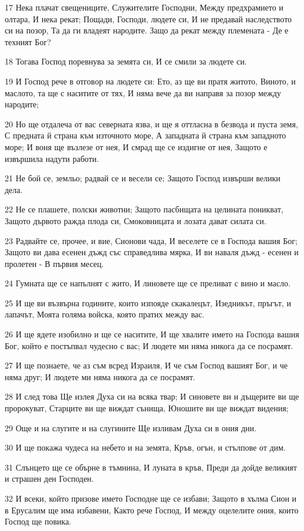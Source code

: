 \par 17 Нека плачат свещениците, Служителите Господни, Между предхрамието и олтара, И нека рекат; Пощади, Господи, людете си, И не предавай наследството си на позор, Та да ги владеят народите. Защо да рекат между племената - Де е техният Бог?
\par 18 Тогава Господ поревнува за земята си, И се смили за людете си.
\par 19 И Господ рече в отговор на людете си: Ето, аз ще ви пратя житото, Виното, и маслото, та ще с наситите от тях, И няма вече да ви направя за позор между народите;
\par 20 Но ще отдалеча от вас северната язва, и ще я оттласна в безвода  и пуста земя, С предната й страна към източното море, А западната й страна към западното море; И воня ще възлезе от нея, И смрад ще се издигне от нея, Защото е извършила надути работи.
\par 21 Не бой се, земльо; радвай се и весели се; Защото Господ извърши велики дела.
\par 22 Не се плашете, полски животни; Защото пасбищата на целината поникват, Защото дървото ражда плода си, Смоковницата и лозата дават силата си.
\par 23 Радвайте се, прочее, и вие, Сионови чада, И веселете се в Господа вашия Бог; Защото ви дава есенен дъжд със справедлива мярка, И ви наваля дъжд - есенен и пролетен -  В първия месец.
\par 24 Гумната ще се напълнят с жито, И линовете ще се преливат с вино и масло.
\par 25 И ще ви възвърна годините, които изпояде скакалецът, Изедникът, пръгът, и лапачът, Моята голяма войска, която пратих между вас.
\par 26 И ще ядете изобилно и ще се наситите, И ще хвалите името на Господа вашия Бог, който е постъпвал чудесно с вас; И людете ми няма никога да се посрамят.
\par 27 И ще познаете, че аз съм всред Израиля, И че съм Господ вашият Бог, и че няма друг; И людете ми няма никога да се посрамят.
\par 28 И след това Ще излея Духа си на всяка твар; И синовете ви и дъщерите ви ще пророкуват, Старците ви ще виждат сънища, Юношите ви ще виждат видения;
\par 29 Още и на слугите и на слугините Ще изливам Духа си в ония дни.
\par 30 И ще покажа чудеса на небето и на земята, Кръв, огън, и стълпове от дим.
\par 31 Слънцето ще се обърне в тъмнина, И луната в кръв, Преди да дойде великият и страшен ден Господен.
\par 32 И всеки, който призове името Господне ще се избави; Защото в хълма Сион и в Ерусалим ще има избавени, Както рече Господ, И между оцелелите ония, които Господ ще повика.


